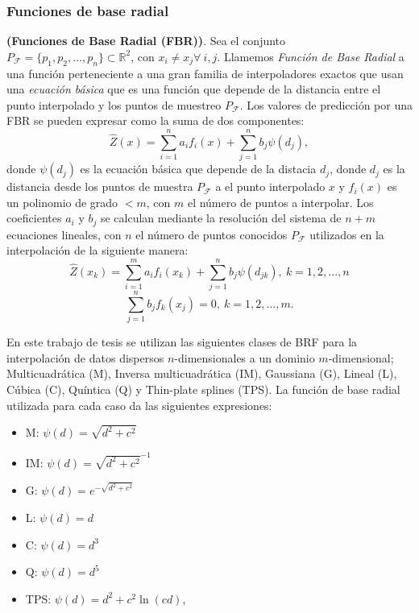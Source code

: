 \subsubsection{Funciones de base radial}


\begin{defn} \textbf{(Funciones de Base Radial (FBR))}. Sea el conjunto $P_{\mathcal{F}} = \{ p_{1}, p_{2}, ..., p_{n} \} \subset \mathbb{R}^{2}$, con $x_{i} \neq x_{j} \forall \ i, j$. Llamemos \textit{Función de Base Radial} a una función perteneciente a una gran familia de interpoladores exactos que usan una \textit{ecuación básica} que es una función que depende de la distancia entre el punto interpolado y los puntos de muestreo $P_{\mathcal{F}}$. Los valores de predicción por una FBR se pueden expresar como la suma de dos componentes: 
\begin{equation} 
\hat{Z}(x)=\sum_{i=1}^{n} a_{i} f_{i}(x) + \sum_{j=1}^{n} b_{j} \psi(d_{j}), 
\end{equation}
donde $\psi(d_{j})$ es la ecuación básica que depende de la distacia $d_{j}$, donde $d_{j}$ es la distancia desde los puntos de muestra $P_{\mathcal{F}}$ a el punto interpolado $x$ y $f_{i}(x)$ es un polinomio de grado $< m$, con $m$ el número de puntos a interpolar. Los coeficientes $a_{i}$ y $b_{j}$ se calculan mediante la resolución del sistema de $n + m$ ecuaciones lineales, con $n$  el número de puntos conocidos $P_{\mathcal{F}}$ utilizados en la interpolación de la siguiente manera:
\begin{equation}
\hat{Z}(x_{k}) = \sum_{i=1}^{m} a_{i} f_{i}(x_{k}) + \sum_{j=1}^{n} b_{j} \psi(d_{jk}), \ k=1, 2, ..., n 
\end{equation}
\[ \sum_{j=1}^{n} b_{j} f_{k}(x_{j}) = 0, \ k= 1, 2, ..., m. \]
\end{defn}

En este trabajo de tesis se utilizan las siguientes clases de BRF para la interpolación de datos dispersos $n$-dimensionales a un dominio $m$-dimensional; Multicuadrática (M), Inversa multicuadrática (IM), Gaussiana (G), Lineal (L), Cúbica (C), Quíntica (Q) y Thin-plate splines (TPS). La función de base radial utilizada para cada caso da las siguientes expresiones:
\begin{itemize}
\item M: $\psi(d) = \sqrt{d^{2} + c^{2}}$
\item IM: $\psi(d) = \sqrt{d^{2} + c^{2}}^{-1}$
\item G: $\psi(d) = e^{-\sqrt{d^{2} + c^{2}}}$
\item L: $\psi(d) = d$
\item C: $\psi(d) = d^{3}$
\item Q: $\psi(d) = d^{5}$
\item TPS: $\psi(d) =  d^{2} + c^{2} \ln (cd)$,
\end{itemize}

